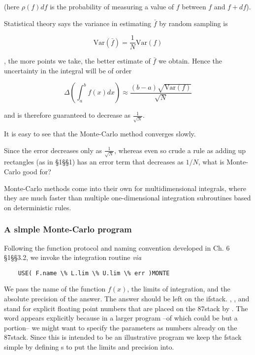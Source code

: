 (here $\rho(f)df$ is the probability of measuring a value of $f$ between $f$ and $f + df$).

Statistical theory says the variance in estimating $\bar{f}$ by random sampling is

\begin{equation}
\text{Var}(\bar{f}) = \frac{1}{N} \text{Var}(f)
\end{equation}

\ie, the more points we take, the better estimate of $\bar{f}$ we obtain. Hence the uncertainty in the integral will be of order

\begin{equation}
\Delta \left(\int_{a}^{b}f(x)dx\right) \approx \frac{(b-a)\sqrt{\text{Var}(f)}}{\sqrt{N}}
\end{equation}

and is therefore guaranteed to decrease as $\frac{1}{\sqrt{N}}$.

It is easy to see that the Monte-Carlo method converges slowly.

Since the error decreases only as $\frac{1}{\sqrt{N}}$, whereas even so crude a rule as adding up rectangles (as in \S1\S\S1) has an error term that decreases as $1/N$, what is Monte-Carlo good for?

Monte-Carlo methods come into their own for multidimensional integrals, where they are much faster than multiple one-dimensional integration subroutines based on deterministic rules.

\subsubsection{A slmple Monte-Carlo program}
Following the function protocol and naming convention developed in Ch. 6 \S1\S\S3.2, we invoke the integration routine \textit{via}

\begin{lstlisting}
    USE( F.name \% L.lim \% U.lim \% err )MONTE
\end{lstlisting}

We pass  the name  of the function $f(x)$, the limits of integration, and the absolute precision of the answer. The answer should be left on the ifstack. , , and  stand for explicit ﬂoating point numbers that are placed on the 87stack by \bc{\%}. The word \bc{\%} appears explicitly because in a larger program --of which  could be but a portion-- we might want to specify the parameters as numbers already on the 87stack. Since this is intended to be an illustrative program we keep the fstack simple by defining s to put the limits and precision into.


